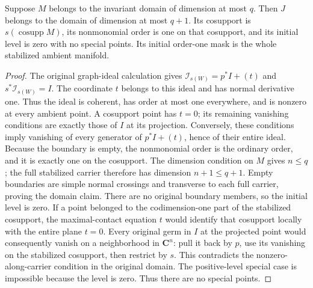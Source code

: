 \begin{lemma}
\label{hir:disjoint-zero-coordinate-initial-regime}
\leanok
Suppose $M$ belongs to the invariant domain of dimension at most $q$.
Then $J$ belongs to the domain of dimension at most $q+1$. Its cosupport is
$s(\operatorname{cosupp}M)$, its nonmonomial order is one on that cosupport,
and its initial level is zero with no special points. Its initial order-one
mask is the whole stabilized ambient manifold.
\end{lemma}
\begin{proof}
The original graph-ideal calculation gives
$\mathcal I_{s(W)}=p^*I+(t)$ and $s^*\mathcal I_{s(W)}=I$.
The coordinate $t$ belongs to this ideal and has normal derivative one.
Thus the ideal is coherent, has order at most one everywhere, and is
nonzero at every ambient point. A cosupport point has $t=0$; its remaining
vanishing conditions are exactly those of $I$ at its projection. Conversely,
these conditions imply vanishing of every generator of $p^*I+(t)$, hence
of their entire ideal. Because the boundary is empty, the nonmonomial
order is the ordinary order, and it is exactly one on the cosupport.
The dimension condition on $M$ gives $n\le q$; the full stabilized carrier
therefore has dimension $n+1\le q+1$. Empty boundaries are simple normal
crossings and transverse to each full carrier, proving the domain claim.
There are no original boundary members, so the initial level is zero.
If a point belonged to the codimension-one part of the stabilized
cosupport, the maximal-contact equation $t$ would identify that cosupport
locally with the entire plane $t=0$. Every original germ in $I$ at the
projected point would consequently vanish on a neighborhood in
$\mathbf C^n$: pull it back by $p$, use its vanishing on the stabilized
cosupport, then restrict by $s$. This contradicts the nonzero-along-carrier
condition in the original domain. The positive-level special case is
impossible because the level is zero. Thus there are no special points.
\end{proof}

